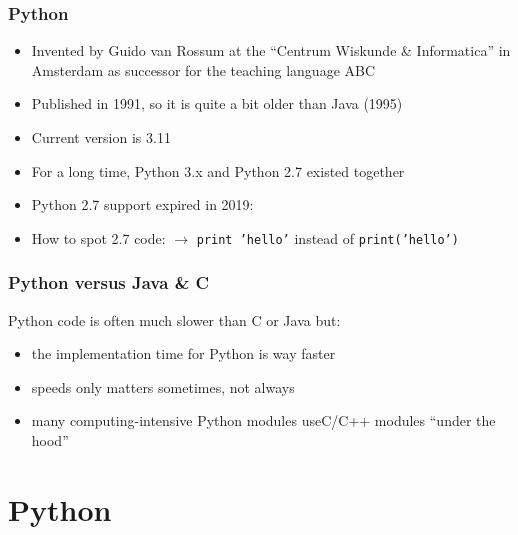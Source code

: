 \documentclass[ngerman]{beamer}
\begin{document}
\begin{frame}

\tableofcontents

\end{frame}


\begin{frame}
\frametitle{Python}

\begin{itemize}
	\item Invented by Guido van Rossum at the \enquote{Centrum Wiskunde \& Informatica} in Amsterdam as successor for the teaching language ABC
	\item Published in 1991, so it is quite a bit older than Java (1995)
	\item Current version is 3.11
	\item For a long time, Python 3.x and Python 2.7 existed together
	\item Python 2.7 support expired in 2019:
	\item How to spot 2.7 code: $\rightarrow$ \texttt{print 'hello'} instead of \texttt{print('hello')}
\end{itemize}

\end{frame}

\begin{frame}
\frametitle{Python versus Java \& C}

Python code is often much slower than C or Java but: \vspace*{1em}

\begin{itemize}
\item the implementation time for Python is way faster
\item speeds only matters sometimes, not always
\item many computing-intensive Python modules use\newline C/C++ modules \enquote{under the hood}
\end{itemize}
\end{frame}




\section{Python}
\end{document}

